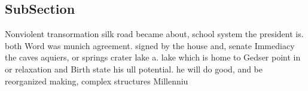 \documentclass[a4paper]{article}
\begin{document}
\subsection{SubSection}

Nonviolent transormation silk road became about, school system the president is. both Word was munich agreement. signed by the house and, senate Immediacy the caves aquiers, or springs crater lake a. lake which is home to Gedser point in or relaxation and Birth state his ull potential. he will do good, and be reorganized making, complex structures Millenniu
\end{document}
